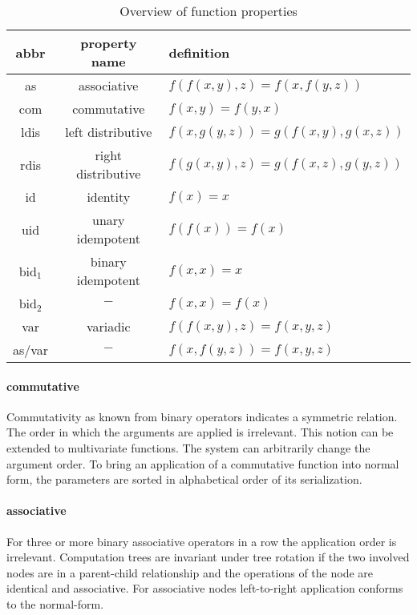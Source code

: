 \documentclass[english]{article}
\begin{document}
\begin{table}[h]
\def\arraystretch{1.2}%
\centering
\begin{tabular}{c | c | l}
abbr & property name & definition \\
\hline
as               & associative        & $f(f(x,y),z) = f(x,f(y,z))$ \\
com              & commutative        & $f(x,y)=f(y,x)$ \\
ldis             & left distributive  & $f(x,g(y,z))=g(f(x,y),g(x,z))$ \\
rdis             & right distributive & $f(g(x,y),z)=g(f(x,z),g(y,z))$ \\
id               & identity           & $f(x) = x$ \\
uid              & unary idempotent   & $f(f(x)) = f(x)$ \\
bid$_{\text{1}}$ & binary idempotent  & $f(x,x) = x$ \\
bid$_{\text{2}}$ & \multicolumn{1}{|c|}{$-$} & $f(x,x) = f(x)$ \\
var              & variadic           & $f(f(x,y),z) = f(x,y,z)$\\
as/var           & \multicolumn{1}{|c|}{$-$} & $f(x,f(y,z)) = f(x,y,z)$ \\
\end{tabular}
\caption{Overview of function properties}
\label{funcprops}
\end{table}

\paragraph{commutative} Commutativity as known from binary operators indicates a symmetric relation. The order in which the arguments are applied is irrelevant. This notion can be extended to multivariate functions. The system can arbitrarily change the argument order. To bring an application of a commutative function into normal form, the parameters are sorted in alphabetical order of its serialization.

\paragraph{associative} For three or more binary associative operators in a row the application order is irrelevant. Computation trees are invariant under tree rotation if the two involved nodes are in a parent-child relationship and the operations of the node are identical and associative. For associative nodes left-to-right application conforms to the normal-form.
\end{document}
